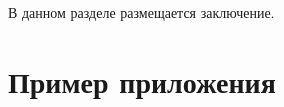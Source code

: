 \documentclass[annotation,times,page4]{itmo-student-thesis}
\begin{document}
	
	
	
	
	\startconclusionpage
	
	В данном разделе размещается заключение.
	
	\printbibliography[heading=trueHeading]
	
	\appendix
	
	\chapter{Пример приложения}
	
\end{document}
